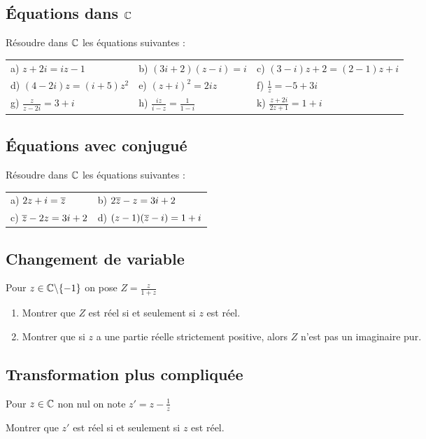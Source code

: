 \documentclass[oneside,12pt]{book}          %
\begin{document}
\subsection{Équations dans ${\mathbb C}$}
Résoudre dans ${\mathbb C}$ les équations suivantes :\\
\begin{tabular}{p{} p{} p{}}
    a) $z+2i=iz-1$ & b) $(3i+2)(z-i)=i$ & c) $(3-i)z+2=(2-1)z+i$\\
    d) $(4-2i)z=(i+5)z^2$ & e) $(z+i)^2=2iz$ & f) $\frac{1}{z}=-5+3i$ \\
    g) $\frac{z}{z-2i}=3+i$ & h) $\frac{iz}{i-z}=\frac{1}{1-i}$ & k) $\frac{z+2i}{2z+1}=1+i$
\end{tabular}


\subsection{Équations avec conjugué}
Résoudre dans ${\mathbb C}$ les équations suivantes : \\
\begin{tabular}{p{} p{}}
    a) $ 2z+i={\overline{z}}$ & b) $2{\overline{z}}-z=3i+2$ \\
    c) ${\overline{z}}-2z=3i+2$ & d) $(z-1)({\overline{z}}-i)=1+i$ 
\end{tabular}



\subsection{Changement de variable}
Pour $z\in{\mathbb C}\backslash\{-1\}$ on pose $Z=\frac{z}{1+z}$
\begin{enumerate}
	\item Montrer que $Z$ est réel si et seulement si $z$ est réel.
	\item Montrer que si $z$ a une partie réelle strictement positive, alors $Z$ n'est pas un imaginaire pur.
\end{enumerate}



\subsection{Transformation plus compliquée}
Pour $z\in{\mathbb C}$ non nul on note $z'=z-\frac{1}{z}$

Montrer que $z'$ est réel si et seulement si $z$ est réel.
\end{document}
